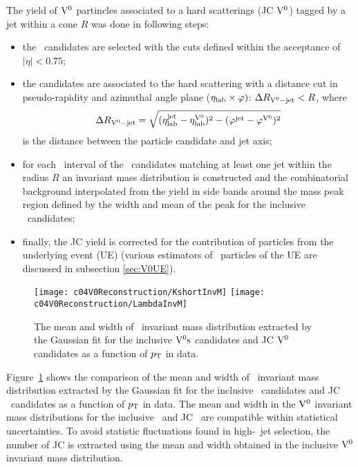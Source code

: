 The yield of ${\rm V}^{0}$ partincles associated to a hard scatterings (JC ${\rm V}^{0}$) tagged by a jet within a cone $R$ was done in following steps:
\begin{itemize}
\item the \Vzero\ candidates are selected with the cuts defined within the acceptance of $|\eta|<0.75$;
\item the candidates are associated to the hard scattering with a distance cut in pseudo-rapidity and azimuthal angle plane ($\eta_{\rm lab} \times \varphi)$: $\Delta R_{{\rm V}^{0}-{\rm jet}}<R$, where
\begin{equation}
\Delta R_{{\rm V}^{0}-{\rm jet}}=\sqrt{(\eta_{\rm lab}^{\rm jet} - \eta_{\rm lab}^{{\rm V}^{0}})^{2} - (\varphi^{\rm jet} - \varphi^{{\rm V}^{0}})^{2}}
\end{equation}
is the distance between the particle candidate and jet axis;
\item for each \pt\ interval of the \Vzero\ candidates matching at least one jet within the radius $R$ an invariant mass distribution  is constructed and the combinatorial background interpolated from the yield in side bands around the mass peak region defined by the width and mean of the peak for the inclusive \Vzero\ candidates;
\item finally, the JC yield is corrected for the contribution of particles from the underlying event (UE) (various estimators of \Vzero\ particles of the UE are discussed in subsection \ref{sec:V0UE}).
\end{itemize}

\begin{figure}[]
\begin{center}
\texttt{[image: c04V0Reconstruction/KshortInvM]}
\texttt{[image: c04V0Reconstruction/LambdaInvM]}
\caption{The mean and width of \Vzero\ invariant mass distribution extracted
         by the Gaussian fit for the inclusive ${\rm V}^{0}{\rm s}$ candidates
         and JC ${\rm V}^{0}$ candidates as a function of $p_{\mathrm{T}}$ in data.}
\label{fig:V0FitInvM}
\end{center}
\end{figure}

Figure~\ref{fig:V0FitInvM} shows the comparison of the mean and width of \Vzero\ invariant mass distribution extracted by the Gaussian fit for the inclusive \Vzeros\ candidates and JC \Vzero\ candidates as a function of $p_{\mathrm{T}}$ in data.
The mean and width in the ${\rm V}^{0}$ invariant mass distributions for the inclusive \Vzeros\ and JC \Vzeros\ are compatible within statistical uncertainties.
To avoid statistic fluctuations found in high-\pT\ jet selection, the number of JC \Vzeros is extracted using the mean and width obtained in the inclusive ${\rm V}^{0}$ invariant mass distribution.

